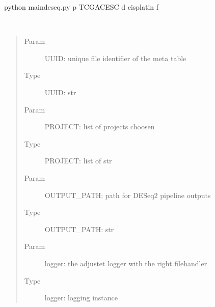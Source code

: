 \documentclass[letterpaper,10pt,english]{sphinxmanual}
\begin{document}
\begin{fulllineitems}
\begin{sphinxVerbatim}[commandchars=\\\{\}]
\PYGZdl{} python main\PYGZus{}deseq.py \PYGZhy{}p TCGA\PYGZhy{}CESC \PYGZhy{}d cisplatin \PYGZhy{}f 
\end{sphinxVerbatim}

\end{fulllineitems}


\begin{fulllineitems}
\label{\detokenize{index:create_matrix_new.download_clinical_tables}}~\begin{quote}\begin{description}
\item[{Param}] \leavevmode
\sphinxAtStartPar
UUID: unique file identifier of the meta table

\item[{Type}] \leavevmode
\sphinxAtStartPar
UUID: str

\item[{Param}] \leavevmode
\sphinxAtStartPar
PROJECT: list of projects choosen

\item[{Type}] \leavevmode
\sphinxAtStartPar
PROJECT: list of str

\item[{Param}] \leavevmode
\sphinxAtStartPar
OUTPUT\_PATH: path for DESeq2 pipeline outputs

\item[{Type}] \leavevmode
\sphinxAtStartPar
OUTPUT\_PATH: str

\item[{Param}] \leavevmode
\sphinxAtStartPar
logger: the adjustet logger with the right filehandler

\item[{Type}] \leavevmode
\sphinxAtStartPar
logger: logging instance

\end{description}\end{quote}


\end{fulllineitems}
\end{document}
